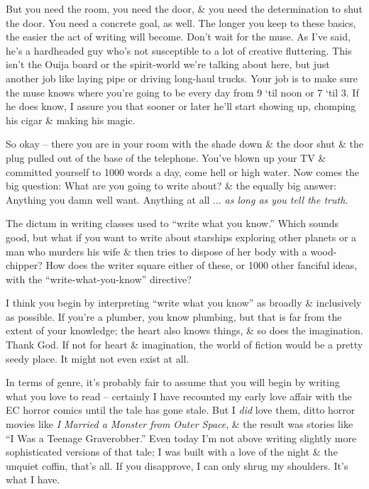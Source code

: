 \documentclass{article}
\numberwithin{equation}{section}
\begin{document}
But you need the room, you need the door, \& you need the determination to shut the door. You need a concrete goal, as well. The longer you keep to these basics, the easier the act of writing will become. Don't wait for the muse. As I've said, he's a hardheaded guy who's not susceptible to a lot of creative fluttering. This isn't the Ouija board or the spirit-world we're talking about here, but just another job like laying pipe or driving long-haul trucks. Your job is to make sure the muse knows where you're going to be every day from 9 `til noon or 7 `til 3. If he does know, I assure you that sooner or later he'll start showing up, chomping his cigar \& making his magic.

 So okay -- there you are in your room with the shade down \& the door shut \& the plug pulled out of the base of the telephone. You've blown up your TV \& committed yourself to 1000 words a day, come hell or high water. Now comes the big question: What are you going to write about? \& the equally big answer: Anything you damn well want. Anything at all $\ldots$ \textit{as long as you tell the truth}.

The dictum in writing classes used to ``write what you know.'' Which sounds good, but what if you want to write about starships exploring other planets or a man who murders his wife \& then tries to dispose of her body with a wood-chipper? How does the writer square either of these, or 1000 other fanciful ideas, with the ``write-what-you-know'' directive?

I think you begin by interpreting ``write what you know'' as broadly \& inclusively as possible. If you're a plumber, you know plumbing, but that is far from the extent of your knowledge; the heart also knows things, \& so does the imagination. Thank God. If not for heart \& imagination, the world of fiction would be a pretty seedy place. It might not even exist at all.

In terms of genre, it's probably fair to assume that you will begin by writing what you love to read -- certainly I have recounted my early love affair with the EC horror comics until the tale has gone stale. But I \textit{did} love them, ditto horror movies like \textit{I Married a Monster from Outer Space}, \& the result was stories like ``I Was a Teenage Graverobber.'' Even today I'm not above writing slightly more sophisticated versions of that tale; I was built with a love of the night \& the unquiet coffin, that's all. If you disapprove, I can only shrug my shoulders. It's what I have.
\end{document}
